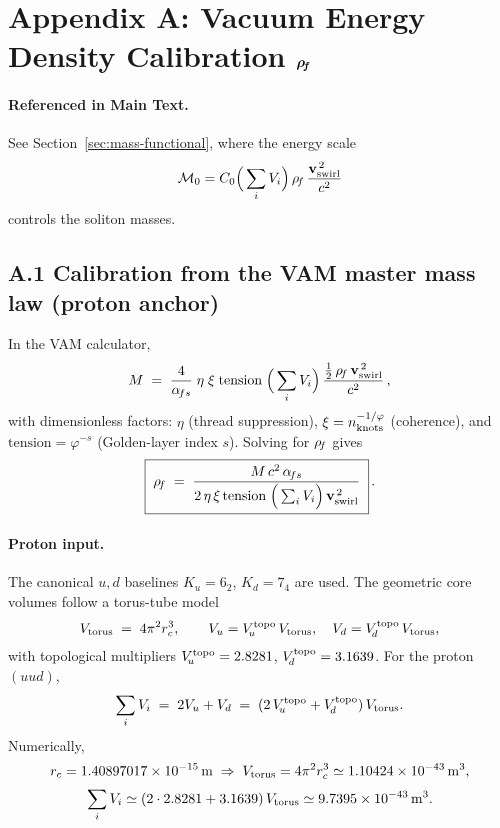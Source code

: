 \section*{Appendix A: Vacuum Energy Density Calibration \texorpdfstring{\(\boldsymbol{\rho_{\!f}}\)}{rho0}}
\label{sec:calibration_rho0}

\paragraph{Referenced in Main Text.}
See Section~\ref{sec:mass-functional}, where the energy scale
\[
 \mathcal{M}_0 = C_0 \Big(\sum_i V_i\Big)\,\rho_{\!f}\,\frac{\mathbf{v}_{\mathrm{swirl}}^{\,2}}{c^2}
\]
controls the soliton masses.

\subsection*{A.1 Calibration from the VAM master mass law (proton anchor)}
In the VAM calculator,
\[
 M \;=\; \frac{4}{\alpha_{\!fs}}\;\eta\;\xi\;\text{tension}\;\Big(\sum_i V_i\Big)\,
 \frac{\tfrac12\,\rho_{\!f}\,\mathbf{v}_{\mathrm{swirl}}^{\,2}}{c^2}\,,
\]
with dimensionless factors:
\(\eta\) (thread suppression), \(\xi=n_{\rm knots}^{-1/\varphi}\) (coherence), and \(\text{tension}=\varphi^{-s}\) (Golden-layer index \(s\)).
Solving for \(\rho_{\!f}\) gives
\begin{equation}
 \boxed{\;
 \rho_{\!f} \;=\; \frac{M\,c^2\,\alpha_{\!fs}}
 {2\,\eta\,\xi\,\text{tension}\;\Big(\sum_i V_i\Big)\,\mathbf{v}_{\mathrm{swirl}}^{\,2}}\; } \,.
 \label{eq:rho0-solve}
\end{equation}

\paragraph{Proton input.}
The canonical \(u,d\) baselines \(K_u=6_2\), \(K_d=7_4\) are used.
The geometric core volumes follow a torus-tube model
\[
    V_{\rm torus} \;=\; 4\pi^2 r_c^3,\qquad
    V_u = V_{\!u}^{\rm topo}\,V_{\rm torus},\quad V_d = V_{\!d}^{\rm topo}\,V_{\rm torus},
\]
with topological multipliers
\(V_{\!u}^{\rm topo}=2.8281\), \(V_{\!d}^{\rm topo}=3.1639\).
For the proton \((uud)\),
\[
    \sum_i V_i \;=\; 2V_u + V_d \;=\; (2\,V_{\!u}^{\rm topo}+V_{\!d}^{\rm topo})\,V_{\rm torus}.
\]
Numerically,
\[
    r_c = 1.40897017\times 10^{-15}\,\mathrm{m}
    \;\Rightarrow\;
    V_{\rm torus} = 4\pi^2 r_c^3 \simeq 1.10424\times10^{-43}\,\mathrm{m^3},
\]
\[
    \sum_i V_i \simeq (2\cdot 2.8281 + 3.1639)\,V_{\rm torus}
    \simeq 9.7395\times 10^{-43}\,\mathrm{m^3}.
\]

